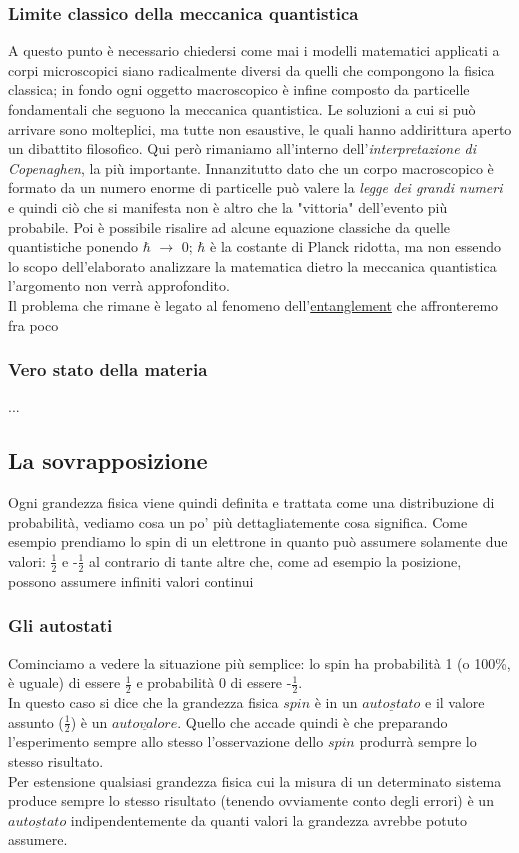 \subsubsection{Limite classico della meccanica quantistica}
A questo punto è necessario chiedersi come mai i modelli matematici applicati a corpi microscopici siano radicalmente diversi da quelli che compongono la fisica classica; in fondo ogni oggetto macroscopico è infine composto da particelle fondamentali che seguono la meccanica quantistica.
Le soluzioni a cui si può arrivare sono molteplici, ma tutte non esaustive, le quali hanno addirittura aperto un dibattito filosofico. Qui però rimaniamo all'interno dell'\textit{interpretazione di Copenaghen}, la più importante. Innanzitutto dato che un corpo macroscopico è formato da un numero enorme di particelle può valere la \textit{legge dei grandi numeri} e quindi ciò che si manifesta non è altro che la "vittoria" dell'evento più probabile. Poi è possibile risalire ad alcune equazione classiche da quelle quantistiche ponendo $\hbar$ $\to$ 0; $\hbar$ è la costante di Planck ridotta, ma non essendo lo scopo dell'elaborato analizzare la matematica dietro la meccanica quantistica l'argomento non verrà approfondito.\\
Il problema che rimane è legato al fenomeno dell'\hyperref[sec:entanglement]{entanglement} che affronteremo fra poco
\subsubsection{Vero stato della materia}
...

\subsection{La sovrapposizione}
Ogni grandezza fisica viene quindi definita e trattata come una distribuzione di probabilità, vediamo cosa un po' più dettagliatemente cosa significa. Come esempio prendiamo lo spin di un elettrone in quanto può assumere solamente due valori: $\frac{1}{2}$ e -$\frac{1}{2}$ al contrario di tante altre che, come ad esempio la posizione, possono assumere infiniti valori continui
\subsubsection{Gli autostati}
Cominciamo a vedere la situazione più semplice: lo spin ha probabilità 1 (o 100\%, è uguale) di essere $\frac{1}{2}$ e probabilità 0 di essere -$\frac{1}{2}$.\\
In questo caso si dice che la grandezza fisica $\textit{spin}$ è in un $\underline{autostato}$ e il valore assunto ($\frac{1}{2}$) è un $\underline{autovalore}$. Quello che accade quindi è che preparando l'esperimento sempre allo stesso l'osservazione dello $\textit{spin}$ produrrà sempre lo stesso risultato.\\
Per estensione qualsiasi grandezza fisica cui la misura di un determinato sistema produce sempre lo stesso risultato (tenendo ovviamente conto degli errori) è un $\underline{autostato}$ indipendentemente da quanti valori la grandezza avrebbe potuto assumere.
